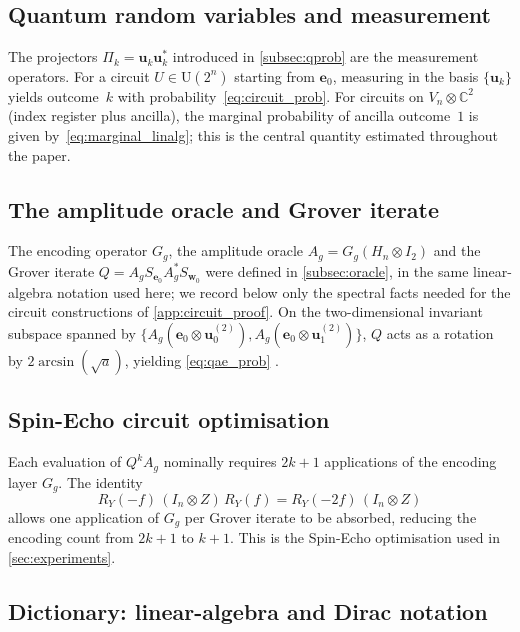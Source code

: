\documentclass[12pt,a4paper]{article}
\theoremstyle{plain}
\theoremstyle{definition}
\theoremstyle{remark}
\begin{document}
\subsection{Quantum random variables and measurement}

The projectors $\Pi_k = \mathbf{u}_k\mathbf{u}_k^*$ introduced in
\cref{subsec:qprob} are the measurement operators.
For a circuit $U \in \mathrm{U}(2^n)$ starting from $\mathbf{e}_0$,
measuring in the basis $\{\mathbf{u}_k\}$ yields outcome~$k$ with
probability~\eqref{eq:circuit_prob}.
For circuits on $V_n \otimes \mathbb{C}^2$ (index register plus
ancilla), the marginal probability of ancilla outcome~$1$ is given
by~\eqref{eq:marginal_linalg}; this is the central quantity
estimated throughout the paper.

\subsection{The amplitude oracle and Grover iterate}

The encoding operator $G_g$, the amplitude oracle
$A_g = G_g(H_n\otimes I_2)$ and the Grover iterate
$Q = A_g S_{\mathbf{e}_0} A_g^* S_{\mathbf{w}_0}$ were defined in
\cref{subsec:oracle}, in the same linear-algebra notation used here;
we record below only the spectral facts needed for the circuit
constructions of \cref{app:circuit_proof}.
On the two-dimensional invariant subspace spanned by
$\{A_g(\mathbf{e}_0\otimes\mathbf{u}_0^{(2)}),
   A_g(\mathbf{e}_0\otimes\mathbf{u}_1^{(2)})\}$,
$Q$ acts as a rotation by $2\arcsin(\sqrt{a})$,
yielding \eqref{eq:qae_prob} \cite{BrassardHoyerMoscaTapp2002}.

\subsection{Spin-Echo circuit optimisation}

Each evaluation of $Q^kA_g$ nominally requires $2k+1$ applications
of the encoding layer $G_g$.
The identity \cite{CarreraVazquezWoerner2020}
\begin{equation}
  R_Y(-f)\,(I_n\otimes Z)\,R_Y(f) = R_Y(-2f)\,(I_n\otimes Z)
  \label{eq:spinecho_id}
\end{equation}
allows one application of $G_g$ per Grover iterate to be absorbed,
reducing the encoding count from $2k+1$ to $k+1$.
This is the Spin-Echo optimisation used in \cref{sec:experiments}.

\subsection{Dictionary: linear-algebra and Dirac notation}
\label{app:dirac}
\end{document}
